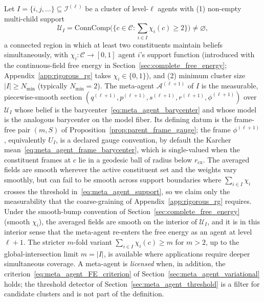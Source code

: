\begin{definition}
Let $I = \{i, j, \ldots\} \subseteq \mathcal{I}^{(\ell)}$ be a cluster of level-$\ell$ agents with (1) non-empty multi-child support
\begin{equation}
\mathcal{U}_I = \mathrm{ConnComp}\Big(\big\{c \in \mathcal{C}: \textstyle\sum_{i \in I} \chi_i(c) \ge 2\big\}\Big) \neq \varnothing,
\label{eq:meta_agent_support}
\end{equation}
a connected region in which at least two constituents maintain beliefs simultaneously, with $\chi_i: \mathcal{C} \to [0, 1]$ agent $i$'s support function (introduced with the continuous-field free energy in Section~\ref{sec:complete_free_energy}; Appendix~\ref{app:rigorous_rg} takes $\chi_i \in \{0, 1\}$), and (2) minimum cluster size $|I| \geq N_{\min}$ (typically $N_{\min} = 2$). The meta-agent $\mathcal{A}^{(\ell+1)}$ of $I$ is the measurable, piecewise-smooth section $(q^{(\ell+1)}, p^{(\ell+1)}, s^{(\ell+1)}, r^{(\ell+1)}, \phi^{(\ell+1)})$ over $\mathcal{U}_I$ whose belief is the barycenter~\eqref{eq:meta_agent_barycenter} and whose model is the analogous barycenter on the model fiber. Its defining datum is the frame-free pair $(m, S)$ of Proposition~\ref{prop:parent_frame_gauge}; the frame $\phi^{(\ell+1)}$, equivalently $U_I$, is a declared gauge convention, by default the Karcher mean~\eqref{eq:meta_agent_frame_barycenter}, which is single-valued when the constituent frames at $c$ lie in a geodesic ball of radius below $r_{\mathrm{cx}}$. The averaged fields are smooth wherever the active constituent set and the weights vary smoothly, but can fail to be smooth across support boundaries where $\sum_{i \in I}\chi_i$ crosses the threshold in~\eqref{eq:meta_agent_support}, so we claim only the measurability that the coarse-graining of Appendix~\ref{app:rigorous_rg} requires. Under the smooth-bump convention of Section~\ref{sec:complete_free_energy} (smooth $\chi_i$), the averaged fields are smooth on the interior of $\mathcal{U}_I$, and it is in this interior sense that the meta-agent re-enters the free energy as an agent at level $\ell+1$. The stricter $m$-fold variant $\sum_{i \in I}\chi_i(c) \ge m$ for $m > 2$, up to the global-intersection limit $m = |I|$, is available where applications require deeper simultaneous coverage. A meta-agent is \emph{licensed} when, in addition, the criterion~\eqref{eq:meta_agent_FE_criterion} of Section~\ref{sec:meta_agent_variational} holds; the threshold detector of Section~\ref{sec:meta_agent_threshold} is a filter for candidate clusters and is not part of the definition.
\end{definition}

